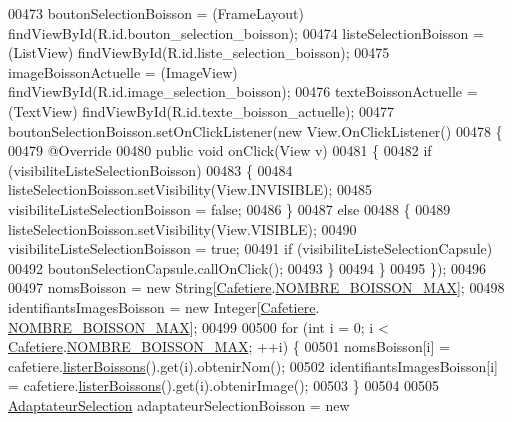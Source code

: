 \begin{DoxyCode}
00473         boutonSelectionBoisson = (FrameLayout) findViewById(R.id.bouton\_selection\_boisson);
00474         listeSelectionBoisson = (ListView) findViewById(R.id.liste\_selection\_boisson);
00475         imageBoissonActuelle = (ImageView) findViewById(R.id.image\_selection\_boisson);
00476         texteBoissonActuelle = (TextView) findViewById(R.id.texte\_boisson\_actuelle);
00477         boutonSelectionBoisson.setOnClickListener(\textcolor{keyword}{new} View.OnClickListener()
00478         \{
00479             @Override
00480             \textcolor{keyword}{public} \textcolor{keywordtype}{void} onClick(View v)
00481             \{
00482                 \textcolor{keywordflow}{if} (visibiliteListeSelectionBoisson)
00483                 \{
00484                     listeSelectionBoisson.setVisibility(View.INVISIBLE);
00485                     visibiliteListeSelectionBoisson = \textcolor{keyword}{false};
00486                 \}
00487                 \textcolor{keywordflow}{else}
00488                 \{
00489                     listeSelectionBoisson.setVisibility(View.VISIBLE);
00490                     visibiliteListeSelectionBoisson = \textcolor{keyword}{true};
00491                     \textcolor{keywordflow}{if} (visibiliteListeSelectionCapsule)
00492                         boutonSelectionCapsule.callOnClick();
00493                 \}
00494             \}
00495         \});
00496 
00497         nomsBoisson = \textcolor{keyword}{new} String[\hyperlink{classcom_1_1example_1_1ekawa_1_1_cafetiere}{Cafetiere}.\hyperlink{classcom_1_1example_1_1ekawa_1_1_cafetiere_a2be5950bf3bb155b8396593d390b808b}{NOMBRE\_BOISSON\_MAX}];
00498         identifiantsImagesBoisson = \textcolor{keyword}{new} Integer[\hyperlink{classcom_1_1example_1_1ekawa_1_1_cafetiere}{Cafetiere}.
      \hyperlink{classcom_1_1example_1_1ekawa_1_1_cafetiere_a2be5950bf3bb155b8396593d390b808b}{NOMBRE\_BOISSON\_MAX}];
00499 
00500         \textcolor{keywordflow}{for} (\textcolor{keywordtype}{int} i = 0; i < \hyperlink{classcom_1_1example_1_1ekawa_1_1_cafetiere}{Cafetiere}.\hyperlink{classcom_1_1example_1_1ekawa_1_1_cafetiere_a2be5950bf3bb155b8396593d390b808b}{NOMBRE\_BOISSON\_MAX}; ++i) \{
00501             nomsBoisson[i] = cafetiere.\hyperlink{classcom_1_1example_1_1ekawa_1_1_cafetiere_a508a256d85a4e78c2b5c1a45899fcd99}{listerBoissons}().get(i).obtenirNom();
00502             identifiantsImagesBoisson[i] = cafetiere.\hyperlink{classcom_1_1example_1_1ekawa_1_1_cafetiere_a508a256d85a4e78c2b5c1a45899fcd99}{listerBoissons}().get(i).obtenirImage();
00503         \}
00504 
00505         \hyperlink{classcom_1_1example_1_1ekawa_1_1_ihm_1_1_adaptateur_selection}{AdaptateurSelection} adaptateurSelectionBoisson = \textcolor{keyword}{new} 

\end{DoxyCode}
